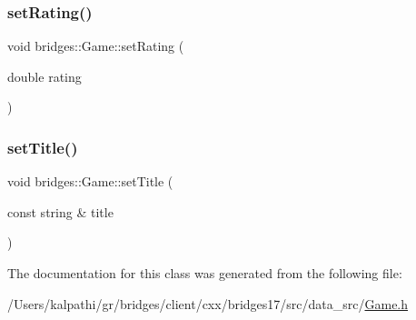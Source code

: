\mbox{\label{classbridges_1_1_game_a0b9b3180975b2d3028b9090559bb6624}} 
\subsubsection{\texorpdfstring{set\+Rating()}{setRating()}}
{\footnotesize\ttfamily void bridges\+::\+Game\+::set\+Rating (\begin{DoxyParamCaption}\item[{double}]{rating }\end{DoxyParamCaption})\hspace{0.3cm}{\ttfamily [inline]}}

\mbox{\label{classbridges_1_1_game_af5c88115cd037f6d5853fdf1ff79f3a3}} 
\subsubsection{\texorpdfstring{set\+Title()}{setTitle()}}
{\footnotesize\ttfamily void bridges\+::\+Game\+::set\+Title (\begin{DoxyParamCaption}\item[{const string \&}]{title }\end{DoxyParamCaption})\hspace{0.3cm}{\ttfamily [inline]}}



The documentation for this class was generated from the following file\+:\begin{DoxyCompactItemize}
\item 
/\+Users/kalpathi/gr/bridges/client/cxx/bridges17/src/data\+\_\+src/\mbox{\hyperlink{_game_8h}{Game.\+h}}\end{DoxyCompactItemize}
